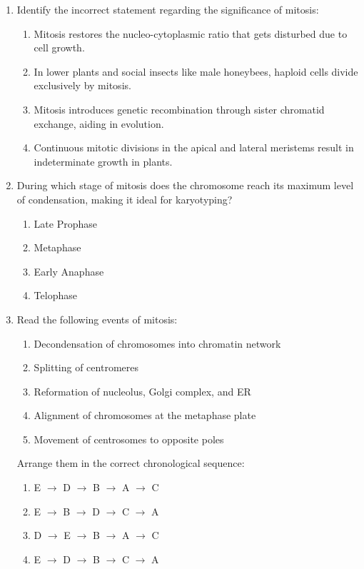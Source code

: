 \documentclass[11pt,a4paper]{article}
\begin{document}
\begin{enumerate}[label=\textbf{\arabic*.}, leftmargin=*]
\item Identify the incorrect statement regarding the significance of mitosis:
\begin{enumerate}[label=(\alph*)]
    \item Mitosis restores the nucleo-cytoplasmic ratio that gets disturbed due to cell growth.
    \item In lower plants and social insects like male honeybees, haploid cells divide exclusively by mitosis.
    \item Mitosis introduces genetic recombination through sister chromatid exchange, aiding in evolution.
    \item Continuous mitotic divisions in the apical and lateral meristems result in indeterminate growth in plants.
\end{enumerate}

\item During which stage of mitosis does the chromosome reach its maximum level of condensation, making it ideal for karyotyping?
\begin{enumerate}[label=(\alph*)]
    \item Late Prophase
    \item Metaphase
    \item Early Anaphase
    \item Telophase
\end{enumerate}

\item Read the following events of mitosis:
\begin{enumerate}[label=(\Alph*)]
    \item Decondensation of chromosomes into chromatin network
    \item Splitting of centromeres
    \item Reformation of nucleolus, Golgi complex, and ER
    \item Alignment of chromosomes at the metaphase plate
    \item Movement of centrosomes to opposite poles
\end{enumerate}
Arrange them in the correct chronological sequence:
\begin{enumerate}[label=(\alph*)]
    \item E $\rightarrow$ D $\rightarrow$ B $\rightarrow$ A $\rightarrow$ C
    \item E $\rightarrow$ B $\rightarrow$ D $\rightarrow$ C $\rightarrow$ A
    \item D $\rightarrow$ E $\rightarrow$ B $\rightarrow$ A $\rightarrow$ C
    \item E $\rightarrow$ D $\rightarrow$ B $\rightarrow$ C $\rightarrow$ A
\end{enumerate}


\end{enumerate}
\end{document}
